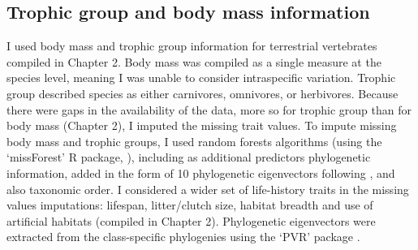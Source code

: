 \subsection{Trophic group and body mass information}

I used body mass and trophic group information for terrestrial vertebrates compiled in Chapter 2. Body mass was compiled as a single measure at the species level, meaning I was unable to consider intraspecific variation. Trophic group described species as either carnivores, omnivores, or herbivores. Because there were gaps in the availability of the data, more so for trophic group than for body mass (Chapter 2), I imputed the missing trait values. To impute missing body mass and trophic groups, I used random forests algorithms (using the `missForest' R package, \citep{}), including as additional predictors phylogenetic information, added in the form of 10 phylogenetic eigenvectors \citep{DinizFilho2012} following \citet{Penone2014}, and also taxonomic order. I considered a wider set of life-history traits in the missing values imputations: lifespan, litter/clutch size, habitat breadth and use of artificial habitats (compiled in Chapter 2). Phylogenetic eigenvectors were extracted from the class-specific phylogenies using the `PVR' package \citep{Santos2018}.  

